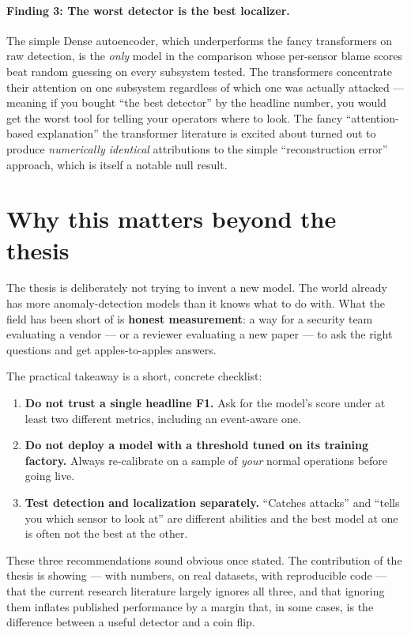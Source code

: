 \documentclass[11pt,a4paper]{article}
\begin{document}
\paragraph{Finding 3: The worst detector is the best localizer.}
The simple Dense autoencoder, which underperforms the fancy transformers on raw detection, is the \emph{only} model in the comparison whose per-sensor blame scores beat random guessing on every subsystem tested. The transformers concentrate their attention on one subsystem regardless of which one was actually attacked --- meaning if you bought ``the best detector'' by the headline number, you would get the worst tool for telling your operators where to look. The fancy ``attention-based explanation'' the transformer literature is excited about turned out to produce \emph{numerically identical} attributions to the simple ``reconstruction error'' approach, which is itself a notable null result.

\section{Why this matters beyond the thesis}

The thesis is deliberately not trying to invent a new model. The world already has more anomaly-detection models than it knows what to do with. What the field has been short of is \textbf{honest measurement}: a way for a security team evaluating a vendor --- or a reviewer evaluating a new paper --- to ask the right questions and get apples-to-apples answers.

The practical takeaway is a short, concrete checklist:

\begin{enumerate}
  \item \textbf{Do not trust a single headline F1.} Ask for the model's score under at least two different metrics, including an event-aware one.
  \item \textbf{Do not deploy a model with a threshold tuned on its training factory.} Always re-calibrate on a sample of \emph{your} normal operations before going live.
  \item \textbf{Test detection and localization separately.} ``Catches attacks'' and ``tells you which sensor to look at'' are different abilities and the best model at one is often not the best at the other.
\end{enumerate}

These three recommendations sound obvious once stated. The contribution of the thesis is showing --- with numbers, on real datasets, with reproducible code --- that the current research literature largely ignores all three, and that ignoring them inflates published performance by a margin that, in some cases, is the difference between a useful detector and a coin flip.
\end{document}
